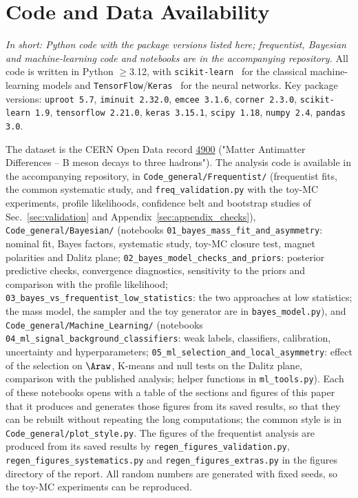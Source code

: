 \section{Code and Data Availability}
\label{sec:code}
\emph{In short: Python code with the package versions listed here; frequentist, Bayesian and machine-learning code and notebooks are in the accompanying repository.}
All code is written in Python $\geq$3.12, with \texttt{scikit-learn}~\cite{sklearn} for the classical machine-learning models and \texttt{TensorFlow}/\texttt{Keras}~\cite{tensorflow} for the neural networks. Key package versions: \texttt{uproot 5.7}, \texttt{iminuit 2.32.0}, \texttt{emcee 3.1.6}, \texttt{corner 2.3.0}, \texttt{scikit-learn 1.9}, \texttt{tensorflow 2.21.0}, \texttt{keras 3.15.1}, \texttt{scipy 1.18}, \texttt{numpy 2.4}, \texttt{pandas 3.0}.

The dataset is the CERN Open Data record \href{https://opendata.cern.ch/record/4900}{4900} ("Matter Antimatter Differences -- B meson decays to three hadrons"). The analysis code is available in the accompanying repository, in \texttt{Code\_general/Frequentist/} (frequentist fits, the common systematic study, and \texttt{freq\_validation.py} with the toy-MC experiments, profile likelihoods, confidence belt and bootstrap studies of Sec.~\ref{sec:validation} and Appendix~\ref{sec:appendix_checks}), \texttt{Code\_general/Bayesian/} (notebooks \texttt{01\_bayes\_mass\_fit\_and\_asymmetry}: nominal fit, Bayes factors, systematic study, toy-MC closure test, magnet polarities and Dalitz plane; \texttt{02\_bayes\_model\_checks\_and\_priors}: posterior predictive checks, convergence diagnostics, sensitivity to the priors and comparison with the profile likelihood; \texttt{03\_bayes\_vs\_frequentist\_low\_statistics}: the two approaches at low statistics; the mass model, the sampler and the toy generator are in \texttt{bayes\_model.py}), and \texttt{Code\_general/Machine\_Learning/} (notebooks \texttt{04\_ml\_signal\_background\_classifiers}: weak labels, classifiers, calibration, uncertainty and hyperparameters; \texttt{05\_ml\_selection\_and\_local\_asymmetry}: effect of the selection on $\Araw$, K-means and null tests on the Dalitz plane, comparison with the published analysis; helper functions in \texttt{ml\_tools.py}). Each of these notebooks opens with a table of the sections and figures of this paper that it produces and generates those figures from its saved results, so that they can be rebuilt without repeating the long computations; the common style is in \texttt{Code\_general/plot\_style.py}. The figures of the frequentist analysis are produced from its saved results by \texttt{regen\_figures\_validation.py}, \texttt{regen\_figures\_systematics.py} and \texttt{regen\_figures\_extras.py} in the figures directory of the report. All random numbers are generated with fixed seeds, so the toy-MC experiments can be reproduced.
